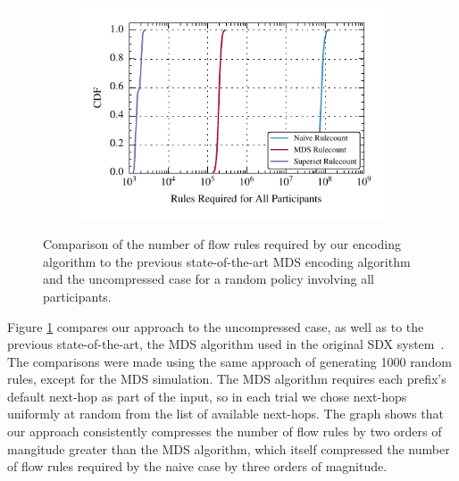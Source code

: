\begin{figure}[t!] 
\begin{minipage}{1\linewidth}
\begin{subfigure}[b]{0.96\linewidth}
\includegraphics[width=\linewidth]{figures/comparison_cdf}
\end{subfigure} 
\end{minipage} 
\caption{Comparison of the number of flow rules required by our encoding algorithm to the previous state-of-the-art MDS encoding algorithm and the uncompressed case for a random policy involving all participants.}
\label{fig:comparison}
\end{figure}


Figure \ref{fig:comparison} compares our approach to the uncompressed case, as well as to the previous state-of-the-art, the MDS algorithm used in the original SDX system~\cite{gupta2014sdx}. The comparisons were made using the same approach of generating 1000 random rules, except for the MDS simulation. The MDS algorithm requires each prefix's default next-hop as part of the input, so in each trial we chose next-hops uniformly at random from the list of available next-hops. The graph shows that our approach consistently compresses the number of flow rules by two orders of mangitude greater than the MDS algorithm, which itself compressed the number of flow rules required by the naive case by three orders of magnitude. 

